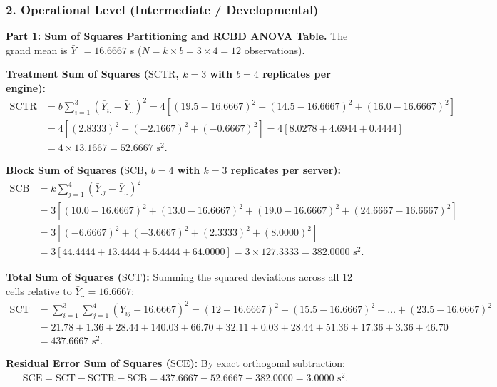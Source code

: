 \subsubsection*{2. Operational Level (Intermediate / Developmental)}

\begin{solproblema}
	\textbf{Part 1: Sum of Squares Partitioning and RCBD ANOVA Table.}
	The grand mean is $\bar{Y}_{..} = 16.6667$ s ($N = k \times b = 3 \times 4 = 12$ observations).
	
	\textbf{Treatment Sum of Squares ($\text{SCTR}$, $k=3$ with $b=4$ replicates per engine):}
	\begin{align}
		\text{SCTR} &= b \sum_{i=1}^3 (\bar{Y}_{i.} - \bar{Y}_{..})^2 = 4 \left[ (19.5 - 16.6667)^2 + (14.5 - 16.6667)^2 + (16.0 - 16.6667)^2 \right] \nonumber \\
		&= 4 \left[ (2.8333)^2 + (-2.1667)^2 + (-0.6667)^2 \right] = 4 \left[ 8.0278 + 4.6944 + 0.4444 \right] \nonumber \\
		&= 4 \times 13.1667 = 52.6667 \text{ s}^2.
	\end{align}
	
	\textbf{Block Sum of Squares ($\text{SCB}$, $b=4$ with $k=3$ replicates per server):}
	\begin{align}
		\text{SCB} &= k \sum_{j=1}^4 (\bar{Y}_{.j} - \bar{Y}_{..})^2 \nonumber \\
		&= 3 \left[ (10.0 - 16.6667)^2 + (13.0 - 16.6667)^2 + (19.0 - 16.6667)^2 + (24.6667 - 16.6667)^2 \right] \nonumber \\
		&= 3 \left[ (-6.6667)^2 + (-3.6667)^2 + (2.3333)^2 + (8.0000)^2 \right] \nonumber \\
		&= 3 \left[ 44.4444 + 13.4444 + 5.4444 + 64.0000 \right] = 3 \times 127.3333 = 382.0000 \text{ s}^2.
	\end{align}
	
	\textbf{Total Sum of Squares ($\text{SCT}$):} Summing the squared deviations across all 12 cells relative to $\bar{Y}_{..} = 16.6667$:
	\begin{align}
		\text{SCT} &= \sum_{i=1}^3 \sum_{j=1}^4 (Y_{ij} - 16.6667)^2 = (12-16.6667)^2 + (15.5-16.6667)^2 + \ldots + (23.5-16.6667)^2 \nonumber \\
		&= 21.78 + 1.36 + 28.44 + 140.03 + 66.70 + 32.11 + 0.03 + 28.44 + 51.36 + 17.36 + 3.36 + 46.70 \nonumber \\
		&= 437.6667 \text{ s}^2.
	\end{align}
	
	\textbf{Residual Error Sum of Squares ($\text{SCE}$):}
	By exact orthogonal subtraction:
	\begin{align}
		\text{SCE} = \text{SCT} - \text{SCTR} - \text{SCB} = 437.6667 - 52.6667 - 382.0000 = 3.0000 \text{ s}^2.
	\end{align}
	

\end{solproblema}
